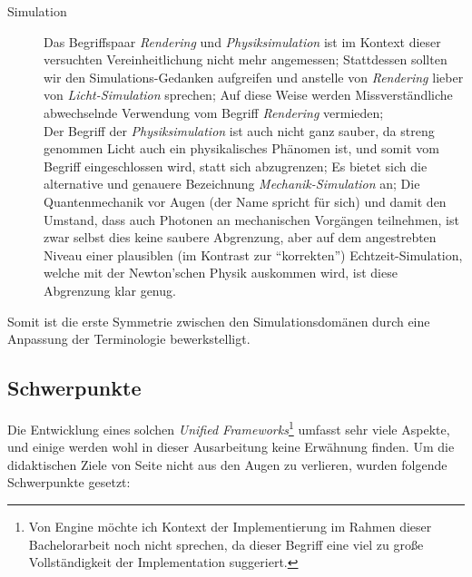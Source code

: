 \begin{description}
	\item[Simulation] Das Begriffspaar \emph{Rendering} und \emph{Physiksimulation} ist im Kontext dieser versuchten 
	Vereinheitlichung nicht mehr angemessen; Stattdessen sollten wir den Simulations-Gedanken aufgreifen und anstelle von
	\emph{Rendering} lieber von \emph{Licht-Simulation} sprechen; Auf diese Weise werden Missverständliche abwechselnde 
	Verwendung vom Begriff \emph{Rendering} vermieden;\\
	Der Begriff der \emph{Physiksimulation} ist auch nicht ganz sauber, da streng genommen Licht auch ein physikalisches
	Phänomen ist, und somit vom Begriff eingeschlossen wird, statt sich abzugrenzen; Es bietet sich die alternative und 
	genauere  Bezeichnung \emph{Mechanik-Simulation} an; Die Quantenmechanik vor Augen (der Name spricht für sich) und 
	damit den Umstand, dass auch Photonen an mechanischen Vorgängen teilnehmen, ist zwar selbst dies keine saubere 	
	Abgrenzung, aber auf dem angestrebten Niveau einer plausiblen (im Kontrast zur "`korrekten"') Echtzeit-Simulation, 
	welche mit der Newton'schen Physik auskommen wird, ist diese Abgrenzung klar genug.
		

	
\end{description}

Somit ist die erste Symmetrie zwischen den Simulationsdomänen durch eine Anpassung der Terminologie bewerkstelligt.





\subsection{Schwerpunkte}

Die Entwicklung eines solchen \emph{Unified Frameworks}\footnote{Von Engine möchte ich Kontext der Implementierung im Rahmen dieser Bachelorarbeit noch nicht sprechen, da dieser Begriff eine viel zu große Vollständigkeit der Implementation suggeriert.} umfasst sehr viele Aspekte, und einige werden wohl in dieser Ausarbeitung keine Erwähnung finden. Um die didaktischen Ziele von Seite \pageref{list:didacticGoals} nicht aus den Augen zu verlieren, wurden folgende Schwerpunkte gesetzt:

